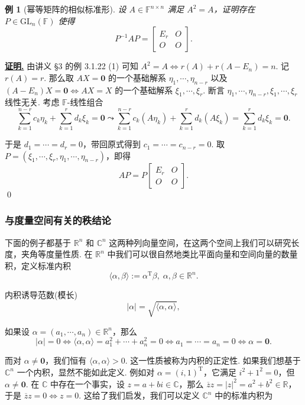 \documentclass[10pt,openany]{article}
\theoremstyle{thmstyle} %
\theoremstyle{defstyle} %
\theoremstyle{prostyle} %
\theoremstyle{exastyle}
\newtheorem{example}[theorem]{例}
\theoremstyle{remstyle}
\renewenvironment{proof}[1][证明]{\par\underline{\textbf{#1.}} \;\fangsong}{\qed\par}
\newcommand{\T}{^{\text{T}}}
\newcommand{\F}{\mathbb{F}}
\newcommand{\gfn}{\text{GL}_n(\mathbb{F})}
\newcommand{\C}{\mathbb{C}}
\newcommand{\R}{\mathbb{R}}
\newcommand{\n}{^{n \times n}}
\begin{document}
\begin{example}[幂等矩阵的相似标准形]
	设 \( A \in \F\n \) 满足 \( A^2=A \)，证明存在 \( P \in \gfn \) 使得
	\[ P^{-1}AP=\begin{bmatrix}
		E_r & O \\
		O & O
	\end{bmatrix}. \]
\end{example}


\begin{proof}
	由讲义 \S 3 的例 3.1.22 (1) 可知 \( A^2=A \Leftrightarrow r(A)+r(A-E_n)=n \). 记 \( r(A)=r \). 那么取 \( AX=\bm{0} \) 的一个基础解系 \( \eta_1,\cdots,\eta_{n-r} \) 以及 \( (A-E_n)X=\bm{0} \Leftrightarrow AX=X \) 的一个基础解系 \( \xi_1,\cdots,\xi_r \). 断言 \( \eta_1,\cdots,\eta_{n-r},\xi_1,\cdots,\xi_r \) 线性无关. 考虑 \( \F\)-线性组合
	\[ \sum_{k=1}^{n-r} c_k\eta_{k}+ \sum_{k=1}^{r} d_k\xi_k= \bm{0} \leadsto \sum_{k=1}^{n-r} c_k(A\eta_{k})+ \sum_{k=1}^{r} d_k(A\xi_k)= \sum_{k=1}^{r} d_k\xi_k=\bm{0}. \]
	
	于是 \( d_1=\cdots=d_r=0 \)，带回原式得到 \( c_1=\cdots=c_{n-r}=0 \). 取 \( P=(\xi_1,\cdots,\xi_r,\eta_1,\cdots,\eta_{n-r}) \)，即得
	\[ AP=P\begin{bmatrix}
		E_r & O \\
		O & O
	\end{bmatrix}. \]
\end{proof}


\subsubsection{与度量空间有关的秩结论}

下面的例子都基于 \( \R^n \) 和 \( \C^n \) 这两种列向量空间，在这两个空间上我们可以研究长度，夹角等度量性质. 在 \( \R^n \) 中我们可以很自然地类比平面向量和空间向量的数量积，定义标准内积 
\[ \langle \alpha,\beta \rangle:= \alpha\T \beta, \; \alpha,\beta \in \R^n. \]

内积诱导范数(模长)
\[ |\alpha|= \sqrt{\langle \alpha,\alpha \rangle}, \]

如果设 \( \alpha=(a_1,\cdots,a_n) \in \R^n \)，那么 
\[ |\alpha|=0 \Leftrightarrow \langle \alpha,\alpha \rangle=a_1^2+\cdots+a_n^2=0 \Leftrightarrow a_1=\cdots=a_n=0 \Leftrightarrow \alpha=\bm{0}. \]

而对 \( \alpha \neq \bm{0} \)，我们恒有 \( \langle \alpha,\alpha \rangle>0 \). 这一性质被称为内积的正定性. 如果我们想基于 \( \C^n \) 一个内积，显然不能如此定义. 例如对 \( \alpha=(i,1)\T \)，它满足 \( i^2+1^2=0 \)，但 \( \alpha \neq \bm{0} \). 在 \( \C \) 中存在一个事实，设 \(  z=a+bi \in \C \)，那么 \( \overline{z}z=|z|^2=a^2+b^2 \in \R \)，于是 \( \overline{z}z=0 \Leftrightarrow z=0 \). 这给了我们启发，我们可以定义 \( \C^n \) 中的标准内积为
\end{document}
